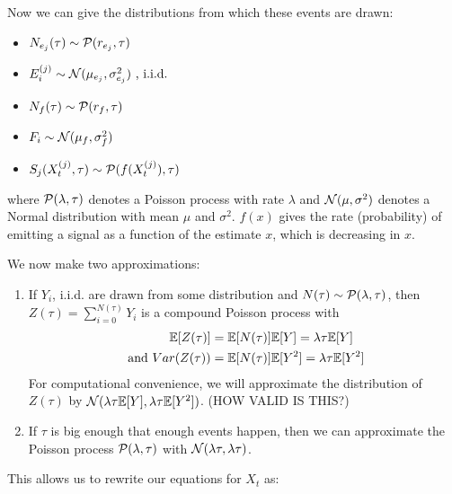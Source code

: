 \documentclass{article}
\begin{document}
Now we can give the distributions from which these events are drawn:
\begin{itemize}
\item $N_{e_j}(\tau)\sim {\mathcal{ P}}(r_{e_j},\tau)$
\item $E_i^{(j)}\sim {\mathcal{ N}}(\mu_{e_j},\sigma^2_{e_j}) \text{ , i.i.d.}$
\item $N_f(\tau)\sim{\mathcal{ P}}(r_f,\tau)$
\item $F_i\sim{\mathcal{ N}}(\mu_f,\sigma^2_f)$
\item $S_j(X_t^{(j)},\tau)\sim{\mathcal{ P}}(f(X_t^{(j)}),\tau)$
\end{itemize}
where ${\mathcal{ P}}(\lambda,\tau)$ denotes a Poisson process with rate $\lambda$ and ${\mathcal{ N}}(\mu,\sigma^2)$ denotes a Normal distribution with mean $\mu$ and $\sigma^2$.  $f(x)$ gives the rate (probability) of emitting a signal as a function of the estimate $x$, which is decreasing in $x$.

We now make two approximations:
\begin{enumerate}
\item If $Y_i$, i.i.d.  are drawn from some distribution and $N(\tau)\sim{\mathcal{ P}}(\lambda,\tau)$, then $Z(\tau)=\sum_{i=0}^{N(\tau)}Y_i$ is a compound Poisson process with 
\begin{align*}
{\mathbb{E}}[Z(\tau)]&={\mathbb{E}}[N(\tau)]{\mathbb{E}}[Y]=\lambda\tau{\mathbb{E}}[Y]
\\ \text{ and } Var(Z(\tau))&={\mathbb{E}}[N(\tau)]{\mathbb{E}}[Y^2]=\lambda\tau{\mathbb{E}}[Y^2]
\end{align*}
For computational convenience, we will approximate the distribution of $Z(\tau)$ by ${\mathcal{ N}}(\lambda\tau{\mathbb{E}}[Y],\lambda\tau{\mathbb{E}}[Y^2])$. (HOW VALID IS THIS?)

\item If $\tau$ is big enough that enough events happen, then we can approximate the Poisson process ${\mathcal{ P}}(\lambda,\tau)$ with ${\mathcal{ N}}(\lambda\tau,\lambda\tau)$.

\end{enumerate}

This allows us to rewrite our equations for $X_t$ as:
\end{document}
